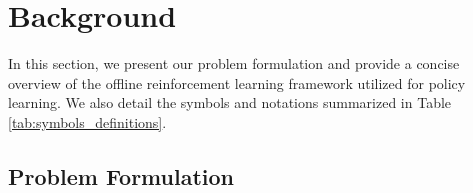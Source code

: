 \section{Background}
\label{background}
In this section, we present our problem formulation and provide a concise overview of the offline reinforcement learning framework utilized for policy learning. We also detail the symbols and notations summarized in Table \ref{tab:symbols_definitions}.

\subsection{Problem Formulation}

